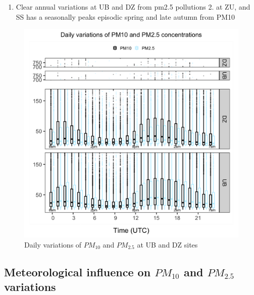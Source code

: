 \documentclass[
  11pt,
]{article}
\providecommand{\tightlist}{%
  \setlength{\itemsep}{0pt}\setlength{\parskip}{0pt}}
\begin{document}
\begin{enumerate}
\def\labelenumi{\arabic{enumi}.}
\tightlist
\item
  Clear annual variations at UB and DZ from pm2.5 pollutions 2. at ZU,
  and SS has a seasonally peaks episodic spring and late autumn from
  PM10
\end{enumerate}

\newpage

\begin{figure}
\centering
\includegraphics[width=5.20833in,height=\textheight,keepaspectratio]{images/figure_5.png}
\caption{Daily variations of \(PM_{10}\) and \(PM_{2.5}\) at UB and DZ
sites}
\end{figure}

\newpage
\subsection{Meteorological influence on $PM_{10}$ and $PM_{2.5}$ variations}
\label{subsec2}
\end{document}
